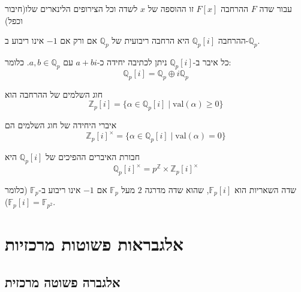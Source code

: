 \documentclass{tstextbook}
\begin{document}
\begin{reminder}
עבור שדה \(F\) ההרחבה \(F[x]\) זו ההוספה של \(x\) לשדה וכל הצירופים הלינארים שלו(חיבור וכפל)

\end{reminder}
\begin{proposition}
ההרחבה \(\mathbb{Q}_p[i]\) היא הרחבה ריבועית של \(\mathbb{Q}_p\) אם ורק אם \(-1\) אינו ריבוע ב-\(\mathbb{Q}_p\).

\end{proposition}
\begin{proposition}
כל איבר ב-\(\mathbb{Q}_p[i]\) ניתן לכתיבה יחידה כ-\(a + b i\) עם \(a, b \in \mathbb{Q}_p\). כלומר:
$$\mathbb{Q}_p[i] = \mathbb{Q}_p \oplus i\mathbb{Q}_p$$

\end{proposition}
\begin{definition}
חוג השלמים של ההרחבה הוא 
$$\mathbb{Z}_p[i] = \{ \alpha \in \mathbb{Q}_p[i] \mid \mathrm{val}(\alpha) \geq 0 \}$$

\end{definition}
\begin{proposition}
איברי היחידה של חוג השלמים הם 
$$\mathbb{Z}_p[i]^{\times} = \{ \alpha \in \mathbb{Q}_p[i] \mid \mathrm{val}(\alpha) = 0 \}$$

\end{proposition}
\begin{proposition}
חבורת האיברים ההפיכים של \(\mathbb{Q}_p[i]\) היא $$\mathbb{Q}_p[i]^{\times} = p^{\mathbb{Z}} \times \mathbb{Z}_p[i]^{\times}$$

שדה השאריות הוא \(\mathbb{F}_p[i]\), שהוא שדה מדרגה \(2\) מעל \(\mathbb{F}_p\) אם \(-1\) אינו ריבוע ב-\(\mathbb{F}_p\) (כלומר \(\mathbb{F}_p[i] = \mathbb{F}_{p^2}\)).

\end{proposition}
\chapter{אלגבראות פשוטות מרכזיות}

\section{אלגברה פשוטה מרכזית}
\end{document}
